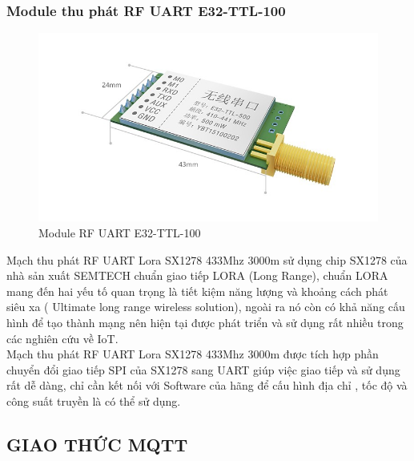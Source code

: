 \subsubsection{Module thu phát RF UART E32-TTL-100}
\begin{figure}[H]
	\centering
	\includegraphics[scale=.4]{Chapter 2/image chapter 2/E32.jpg}
	\caption[Module RF UART E32-TTL-100]{Module RF UART E32-TTL-100}
	\label{hinh22}
\end{figure}
Mạch thu phát RF UART Lora SX1278 433Mhz 3000m sử dụng chip SX1278 của nhà sản xuất SEMTECH chuẩn giao tiếp LORA (Long Range), chuẩn LORA mang đến hai yếu tố quan trọng là tiết kiệm năng lượng và khoảng cách phát siêu xa ( Ultimate long range wireless solution), ngoài ra nó còn có khả năng cấu hình để tạo thành mạng nên hiện tại được phát triển và sử dụng rất nhiều trong các nghiên cứu về IoT.\\
\indent Mạch thu phát RF UART Lora SX1278 433Mhz 3000m được tích hợp phần chuyển đổi giao tiếp SPI của SX1278 sang UART giúp việc giao tiếp và sử dụng rất dễ dàng, chỉ cần kết nối với Software của hãng để cấu hình địa chỉ , tốc độ và công suất truyền là có thể sử dụng.\\
\subsection{GIAO THỨC MQTT}
